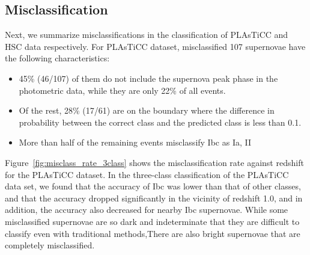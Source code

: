 \documentclass[useamsfonts]{pasj01}
\begin{document}
\subsection{Misclassification}
\label{sec:misclass}
%
Next, we summarize misclassifications in the classification of PLAsTiCC and HSC data respectively.
For PLAsTiCC dataset, misclassified 107 supernovae have the following characteristics:
\begin{itemize}
\item 45\% (46/107) of them do not include the supernova peak phase in the photometric data, while they are only 22\% of all events.
\item Of the rest, 28\% (17/61) are on the boundary where the difference in probability between the correct class and the predicted class is less than 0.1.
\item More than half of the remaining events misclassify Ibc as Ia, II
\end{itemize}
Figure\ \ref{fig:misclass_rate_3class} shows the misclassification rate against redshift for the PLAsTiCC dataset.
In the three-class classification of the PLAsTiCC data set, we found that the accuracy of Ibc was lower than that of other classes, and that the accuracy dropped significantly in the vicinity of redshift 1.0, and in addition, the accuracy also decreased for nearby Ibc supernovae.
While some misclassified supernovae are so dark and indeterminate that they are difficult to classify even with traditional methods,There are also bright supernovae that are completely misclassified.
\end{document}
